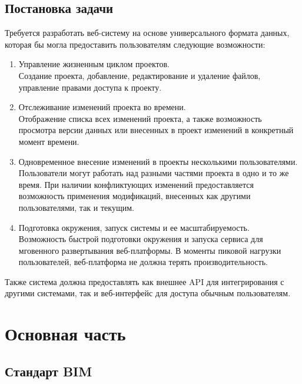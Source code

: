 \documentclass[a4paper,14pt]{extreport} %
\begin{document}
\newpage 
\section{Постановка задачи}

Требуется разработать веб-систему на основе универсального формата данных, которая бы могла предоставить пользователям следующие возможности:
\begin{enumerate}
\item Управление жизненным циклом проектов. \\
Создание проекта, добавление, редактирование  и удаление файлов, управление правами доступа к проекту.
\item Отслеживание изменений проекта во времени. \\
Отображение списка всех изменений проекта, а также возможность просмотра версии данных или внесенных в проект изменений в конкретный момент времени.
\item Одновременное внесение изменений в проекты несколькими пользователями. \\
Пользователи могут работать над разными частями проекта в одно и то же время. При наличии конфликтующих изменений предоставляется возможность применения модификаций, внесенных как другими пользователями, так и текущим.
\item Подготовка окружения, запуск системы и ее масштабируемость. \\
Возможность быстрой подготовки окружения и запуска сервиса для мговенного развертывания веб-платформы. В моменты пиковой нагрузки пользователей, веб-платформа не должна терять производительность.
\end{enumerate}
Также система должна предоставлять как внешнее API для интегрирования с другими системами, так и веб-интерфейс для доступа обычным пользователям.

\newpage

\chapter{Основная часть}
\section{Стандарт BIM}
\end{document}
